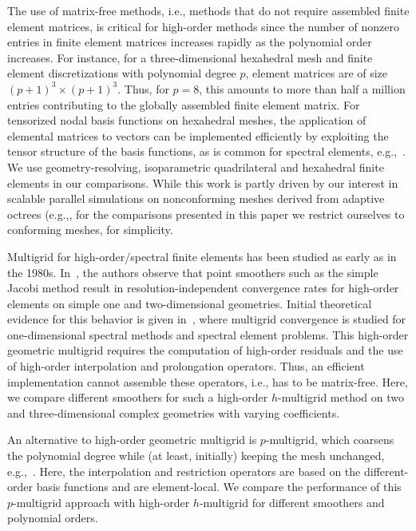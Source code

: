\documentclass[smallcondensed,final]{svjour3}     %
\begin{document}
The use of matrix-free methods, i.e., methods that do not require assembled finite element matrices, is critical for high-order methods since the number of nonzero entries in
finite element matrices increases rapidly as the polynomial order increases.
For instance, for a three-dimensional hexahedral mesh and finite element
discretizations with polynomial degree $p$, element matrices are of size
$(p+1)^3\times (p+1)^3$. Thus, for $p=8$, this amounts to more than
half a million entries contributing to the globally assembled finite element
matrix.  For tensorized nodal basis functions on hexahedral meshes, the
application of elemental matrices to vectors can be implemented efficiently by
exploiting the tensor structure of the basis functions, as is common for
spectral elements, e.g.,~\cite{DevilleFischerMund02}. We use
geometry-resolving, isoparametric quadrilateral and hexahedral finite elements
in our comparisons. While this work is partly driven by our interest in
scalable parallel simulations on nonconforming meshes derived from adaptive
octrees (e.g.,\cite{SundarBirosBursteddeEtAl12, SampathBiros10,
BursteddeGhattasGurnisEtAl10}, for the comparisons presented in this paper we
restrict ourselves to conforming meshes, for simplicity.



Multigrid for high-order/spectral finite elements has been studied as early as
in the 1980s. In~\cite{RonquistPatera87}, the authors observe that point
smoothers such as the simple Jacobi method result in resolution-independent
convergence rates for high-order elements on simple one and two-dimensional
geometries. Initial theoretical evidence for this behavior is given
in~\cite{MadayMunoz88}, where multigrid convergence is studied for
one-dimensional spectral methods and spectral element problems. This high-order
geometric multigrid requires the computation of high-order residuals and the use of
high-order interpolation and prolongation operators. Thus, an efficient implementation
cannot assemble these operators, i.e., has to be matrix-free.  Here, we compare
different smoothers for such a high-order $h$-multigrid method on two
and three-dimensional complex geometries with varying coefficients.

An alternative to high-order geometric multigrid is $p$-multigrid, which
coarsens the polynomial degree while (at least, initially) keeping the mesh
unchanged, e.g.,~\cite{HelenbrookMavriplisAtkins03}. Here, the interpolation and restriction operators are based on the different-order basis functions and are element-local.  We compare the
performance of this $p$-multigrid approach
with high-order $h$-multigrid for different smoothers and polynomial orders.
\end{document}

